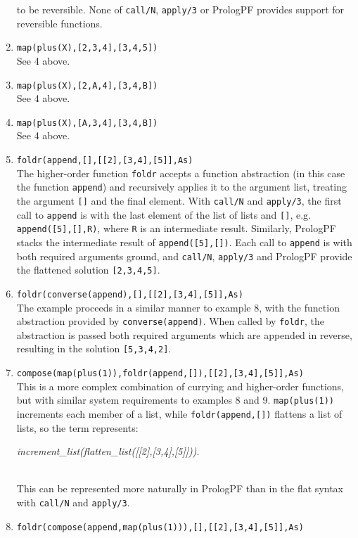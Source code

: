 \begin{enumerate}
{  to be reversible.  None of \texttt{call/N}, \texttt{apply/3} or PrologPF
  provides support for reversible functions.}
\item{\texttt{map(plus(X),[2,3,4],[3,4,5])}\\
  See 4 above.}
\item{\texttt{map(plus(X),[2,A,4],[3,4,B])}\\
  See 4 above.}
\item{\texttt{map(plus(X),[A,3,4],[3,4,B])}\\
  See 4 above.}
\item{\texttt{foldr(append,[],[[2],[3,4],[5]],As)}\\
  The higher-order function \texttt{foldr} accepts a function abstraction
  (in this case the function \texttt{append}) and recursively applies it to
  the argument list, treating the argument \texttt{[]} and the final element.
  With \texttt{call/N} and \texttt{apply/3},
  the first call to \texttt{append} is with the last element of the list of lists 
  and \texttt{[]}, e.g. \texttt{append([5],[],R)}, where \texttt{R} is an intermediate
  result. Similarly, PrologPF stacks the intermediate result of
  \texttt{append([5],[])}.  Each call to \texttt{append} is with both required
  arguments ground, and \texttt{call/N}, \texttt{apply/3} and PrologPF provide the
  flattened solution \mbox{\texttt{[2,3,4,5]}}.}
\item{\texttt{foldr(converse(append),[],[[2],[3,4],[5]],As)}\\
  The example proceeds in a similar manner to example 8, with the function
  abstraction provided by \texttt{converse(append)}.  When called by
  \texttt{foldr}, the abstraction is passed both required arguments which are
  appended in reverse, resulting in the solution \texttt{[5,3,4,2]}.}
\item{\texttt{compose(map(plus(1)),foldr(append,[]),[[2],[3,4],[5]],As)}\\
  This is a more complex combination of currying and higher-order
  functions, but with similar system requirements to examples 8 and 9.
  \texttt{map(plus(1))} increments each member of a list, while 
  \texttt{foldr(append,[])} flattens a list of lists, so the term represents:\\
  \centerline{\mbox{\textit{increment\_{}list(flatten\_{}list([[2],[3,4],[5]]))}}.}\\
  This can be represented
  more naturally in PrologPF than in the flat syntax with \texttt{call/N} and
  \texttt{apply/3}.}
\item{\texttt{foldr(compose(append,map(plus(1))),[],[[2],[3,4],[5]],As)}\\
}
\end{enumerate}
